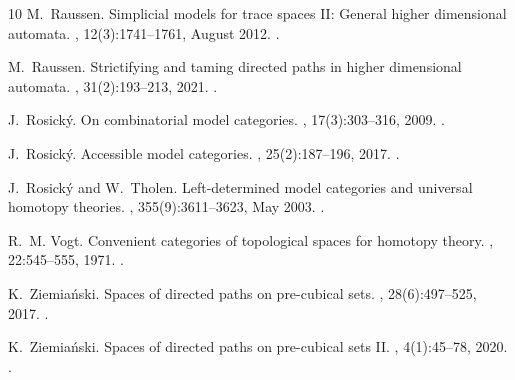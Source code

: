 \documentclass[a4paper,12pt]{amsart}
\theoremstyle{definition}
\begin{document}
\begin{thebibliography}{10}
	M.~Raussen.
	\newblock Simplicial models for trace spaces {II}: General higher dimensional
	automata.
	, 12(3):1741--1761, August 2012.
	\newblock \href {https://doi.org/10.2140/agt.2012.12.1741}
	{}.
	
	M.~Raussen.
	\newblock Strictifying and taming directed paths in higher dimensional
	automata.
	, 31(2):193--213, 2021.
	\newblock \href {https://doi.org/10.1017/s0960129521000128}
	{}.
	
	J.~Rosick{\'y}.
	\newblock On combinatorial model categories.
	, 17(3):303--316, 2009.
	\newblock \href {https://doi.org/10.1007/s10485-008-9171-2}
	{}.
	
	J.~Rosick{\'y}.
	\newblock Accessible model categories.
	, 25(2):187--196, 2017.
	\newblock \href {https://doi.org/10.1007/s10485-015-9419-6}
	{}.
	
	J.~Rosick{\'{y}} and W.~Tholen.
	\newblock Left-determined model categories and universal homotopy theories.
	, 355(9):3611--3623, May 2003.
	\newblock \href {https://doi.org/10.1090/s0002-9947-03-03322-1}
	{}.
	
	R.~M. Vogt.
	\newblock Convenient categories of topological spaces for homotopy theory.
	, 22:545--555, 1971.
	\newblock \href {https://doi.org/10.1007/BF01222616}
	{}.
	
	K.~Ziemia\'{n}ski.
	\newblock Spaces of directed paths on pre-cubical sets.
	, 28(6):497--525, 2017.
	\newblock \href {https://doi.org/10.1007/s00200-017-0316-0}
	{}.
	
	K.~Ziemia\'{n}ski.
	\newblock Spaces of directed paths on pre-cubical sets {II}.
	, 4(1):45--78, 2020.
	\newblock \href {https://doi.org/10.1007/s41468-019-00040-z}
	{}.
	
\end{thebibliography}



% 
%
%	
\end{document}
